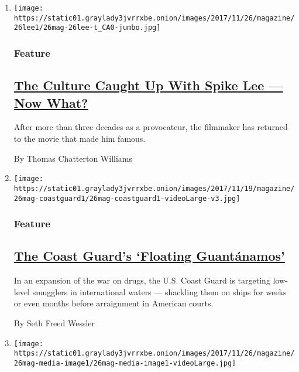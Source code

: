 \begin{enumerate}
\def\labelenumi{\arabic{enumi}.}
\item
  \texttt{[image: https://static01.graylady3jvrrxbe.onion/images/2017/11/26/magazine/26lee1/26mag-26lee-t\_CA0-jumbo.jpg]}

  \hypertarget{feature}{%
  \subsubsection{Feature}\label{feature}}

  \hypertarget{the-culture-caught-up-with-spike-lee--now-what}{%
  \subsection{\texorpdfstring{\href{/2017/11/21/magazine/the-culture-caught-up-with-spike-lee-now-what.html}{The
  Culture Caught Up With Spike Lee --- Now
  What?}}{The Culture Caught Up With Spike Lee --- Now What?}}\label{the-culture-caught-up-with-spike-lee--now-what}}

  After more than three decades as a provocateur, the filmmaker has
  returned to the movie that made him famous.

  By Thomas Chatterton Williams
\item
  \texttt{[image: https://static01.graylady3jvrrxbe.onion/images/2017/11/19/magazine/26mag-coastguard1/26mag-coastguard1-videoLarge-v3.jpg]}

  \hypertarget{feature-1}{%
  \subsubsection{Feature}\label{feature-1}}

  \hypertarget{the-coast-guards-floating-guantuxe1namos}{%
  \subsection{\texorpdfstring{\href{/2017/11/20/magazine/the-coast-guards-floating-guantanamos.html}{The
  Coast Guard's `Floating
  Guantánamos'}}{The Coast Guard's `Floating Guantánamos'}}\label{the-coast-guards-floating-guantuxe1namos}}

  In an expansion of the war on drugs, the U.S. Coast Guard is targeting
  low-level smugglers in international waters --- shackling them on
  ships for weeks or even months before arraignment in American courts.

  By Seth Freed Wessler
\item
  \texttt{[image: https://static01.graylady3jvrrxbe.onion/images/2017/11/26/magazine/26mag-media-image1/26mag-media-image1-videoLarge.jpg]}


\end{enumerate}
